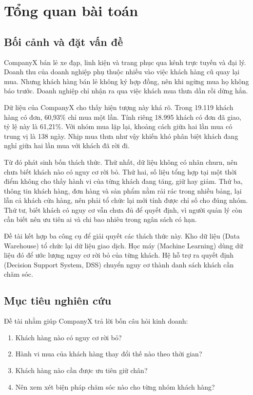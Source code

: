 \section{Tổng quan bài toán}
\subsection{Bối cảnh và đặt vấn đề}
CompanyX bán lẻ xe đạp, linh kiện và trang phục qua kênh trực tuyến và đại lý. Doanh thu của doanh nghiệp phụ thuộc nhiều vào việc khách hàng cũ quay lại mua. Nhưng khách hàng bán lẻ không ký hợp đồng, nên khi ngừng mua họ không báo trước. Doanh nghiệp chỉ nhận ra qua việc khách mua thưa dần rồi dừng hẳn.

Dữ liệu của CompanyX cho thấy hiện tượng này khá rõ. Trong 19.119 khách hàng có đơn, 60,93\% chỉ mua một lần. Tính riêng 18.995 khách có đơn đã giao, tỷ lệ này là 61,21\%. Với nhóm mua lặp lại, khoảng cách giữa hai lần mua có trung vị là 138 ngày. Nhịp mua thưa như vậy khiến khó phân biệt khách đang nghỉ giữa hai lần mua với khách đã rời đi.

Từ đó phát sinh bốn thách thức. Thứ nhất, dữ liệu không có nhãn churn, nên chưa biết khách nào có nguy cơ rời bỏ. Thứ hai, số liệu tổng hợp tại một thời điểm không cho thấy hành vi của từng khách đang tăng, giữ hay giảm. Thứ ba, thông tin khách hàng, đơn hàng và sản phẩm nằm rải rác trong nhiều bảng, lại lẫn cả khách cửa hàng, nên phải tổ chức lại mới tính được chỉ số cho đúng nhóm. Thứ tư, biết khách có nguy cơ vẫn chưa đủ để quyết định, vì người quản lý còn cần biết nên ưu tiên ai và chi bao nhiêu trong ngân sách có hạn.

Đề tài kết hợp ba công cụ để giải quyết các thách thức này. Kho dữ liệu (Data Warehouse) tổ chức lại dữ liệu giao dịch. Học máy (Machine Learning) dùng dữ liệu đó để ước lượng nguy cơ rời bỏ của từng khách. Hệ hỗ trợ ra quyết định (Decision Support System, DSS) chuyển nguy cơ thành danh sách khách cần chăm sóc.

\subsection{Mục tiêu nghiên cứu}
Đề tài nhằm giúp CompanyX trả lời bốn câu hỏi kinh doanh:
\begin{enumerate}[label=\arabic*.]
    \item Khách hàng nào có nguy cơ rời bỏ?
    \item Hành vi mua của khách hàng thay đổi thế nào theo thời gian?
    \item Khách hàng nào cần được ưu tiên giữ chân?
    \item Nên xem xét biện pháp chăm sóc nào cho từng nhóm khách hàng?
\end{enumerate}

